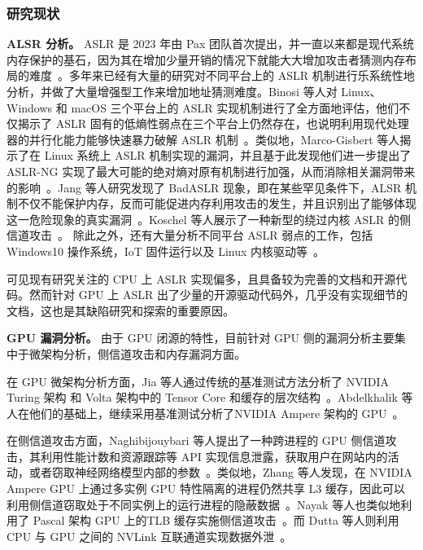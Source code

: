 \subsubsection{研究现状}
\textbf{ALSR 分析。}
ASLR 是 2023 年由 Pax 团队首次提出，并一直以来都是现代系统内存保护的基石，因为其在增加少量开销的情况下就能大大增加攻击者猜测内存布局的难度~\cite{spengler2003pax}。多年来已经有大量的研究对不同平台上的 ASLR 机制进行乐系统性地分析，并做了大量增强型工作来增加地址猜测难度。Binosi 等人对 Linux、Windows 和 macOS 三个平台上的 ASLR 实现机制进行了全方面地评估，他们不仅揭示了 ASLR 固有的低熵性弱点在三个平台上仍然存在，也说明利用现代处理器的并行化能力能够快速暴力破解 ASLR 机制~\cite{binosi2024illusion}。类似地，Marco-Gisbert 等人揭示了在 Linux 系统上 ASLR 机制实现的漏洞，并且基于此发现他们进一步提出了 ASLR-NG 实现了最大可能的绝对熵对原有机制进行加强，从而消除相关漏洞带来的影响~\cite{ASLRA,Gisbert2016ExploitingLA}。Jang 等人研究发现了 BadASLR 现象，即在某些罕见条件下，ALSR 机制不仅不能保护内存，反而可能促进内存利用攻击的发生，并且识别出了能够体现这一危险现象的真实漏洞~\cite{badaslr2021}。Koschel 等人展示了一种新型的绕过内核 ASLR 的侧信道攻击~\cite{tagbleed2020}。
除此之外，还有大量分析不同平台 ASLR 弱点的工作，包括 Windows10 操作系统，IoT 固件运行以及 Linux 内核驱动等~\cite{diaz2021address,ravindrababu2022analysis,nikolaev2022adelie}。

可见现有研究关注的 CPU 上 ASLR 实现偏多，且具备较为完善的文档和开源代码。然而针对 GPU 上 ASLR 出了少量的开源驱动代码外，几乎没有实现细节的文档，这也是其缺陷研究和探索的重要原因。

\textbf{GPU 漏洞分析。}
由于 GPU 闭源的特性，目前针对 GPU 侧的漏洞分析主要集中于微架构分析，侧信道攻击和内存漏洞方面。

在 GPU 微架构分析方面，Jia 等人通过传统的基准测试方法分析了 NVIDIA Turing 架构 和 Volta 架构中的 Tensor Core 和缓存的层次结构~\cite{jia2019dissecting,jia2018dissecting}。Abdelkhalik 等人在他们的基础上，继续采用基准测试分析了NVIDIA Ampere 架构的 GPU~\cite{abdelkhalik2022demystifying}。

在侧信道攻击方面，Naghibijouybari 等人提出了一种跨进程的 GPU 侧信道攻击，其利用性能计数和资源跟踪等 API 实现信息泄露，获取用户在网站内的活动，或者窃取神经网络模型内部的参数~\cite{rendered2018}。类似地，Zhang 等人发现，在 NVIDIA Ampere GPU 上通过多实例 GPU 特性隔离的进程仍然共享 L3 缓存，因此可以利用侧信道窃取处于不同实例上的运行进程的隐蔽数据~\cite{Zhang:2023:CCS}。Nayak 等人也类似地利用了 Pascal 架构 GPU 上的TLB 缓存实施侧信道攻击~\cite{nayak2021mismanaged}。而 Dutta 等人则利用 CPU 与 GPU 之间的 NVLink 互联通道实现数据外泄~\cite{dutta2021leakybuddies}。

